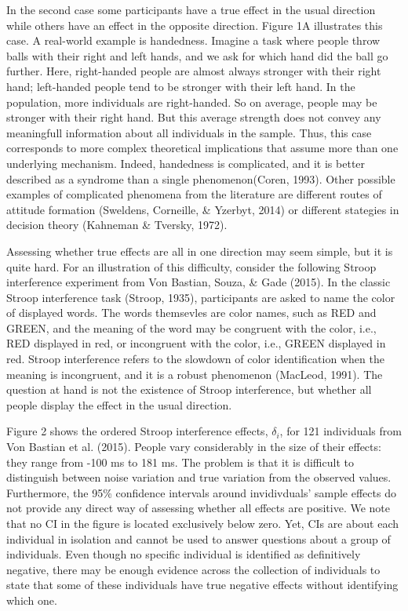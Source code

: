 \documentclass[american,man]{apa6}
\begin{document}
In the second case some participants have a true effect in the usual
direction while others have an effect in the opposite direction. Figure
1A illustrates this case. A real-world example is handedness. Imagine a
task where people throw balls with their right and left hands, and we
ask for which hand did the ball go further. Here, right-handed people
are almost always stronger with their right hand; left-handed people
tend to be stronger with their left hand. In the population, more
individuals are right-handed. So on average, people may be stronger with
their right hand. But this average strength does not convey any
meaningfull information about all individuals in the sample. Thus, this
case corresponds to more complex theoretical implications that assume
more than one underlying mechanism. Indeed, handedness is complicated,
and it is better described as a syndrome than a single phenomenon(Coren,
1993). Other possible examples of complicated phenomena from the
literature are different routes of attitude formation (Sweldens,
Corneille, \& Yzerbyt, 2014) or different stategies in decision theory
(Kahneman \& Tversky, 1972).

Assessing whether true effects are all in one direction may seem simple,
but it is quite hard. For an illustration of this difficulty, consider
the following Stroop interference experiment from Von Bastian, Souza, \&
Gade (2015). In the classic Stroop interference task (Stroop, 1935),
participants are asked to name the color of displayed words. The words
themsevles are color names, such as RED and GREEN, and the meaning of
the word may be congruent with the color, i.e., RED displayed in red, or
incongruent with the color, i.e., GREEN displayed in red. Stroop
interference refers to the slowdown of color identification when the
meaning is incongruent, and it is a robust phenomenon (MacLeod, 1991).
The question at hand is not the existence of Stroop interference, but
whether all people display the effect in the usual direction.

Figure 2 shows the ordered Stroop interference effects, \(\delta_i\),
for 121 individuals from Von Bastian et al. (2015). People vary
considerably in the size of their effects: they range from -100 ms to
181 ms. The problem is that it is difficult to distinguish between noise
variation and true variation from the observed values. Furthermore, the
95\% confidence intervals around invidivduals' sample effects do not
provide any direct way of assessing whether all effects are positive. We
note that no CI in the figure is located exclusively below zero. Yet,
CIs are about each individual in isolation and cannot be used to answer
questions about a group of individuals. Even though no specific
individual is identified as definitively negative, there may be enough
evidence across the collection of individuals to state that some of
these individuals have true negative effects without identifying which
one.
\end{document}
